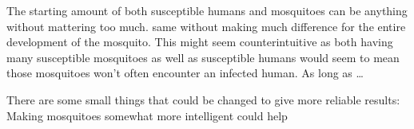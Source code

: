 \documentclass[a4paper]{report}
\begin{document}
The starting amount of both susceptible humans and mosquitoes can be anything
without mattering too much. 
same without making much difference for the entire development of the mosquito.
This might seem counterintuitive as both having many susceptible mosquitoes as
well as susceptible humans would seem to mean those mosquitoes won't often
encounter an infected human. As long as \dots

There are some small things that could be changed to give more reliable results:
Making mosquitoes somewhat more intelligent could help

\end{document}
